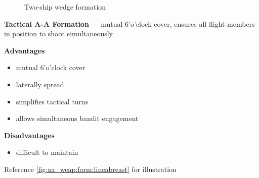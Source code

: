 \begin{figure}[htbp]
\begin{minipage}[b]{0.5\textwidth}
        \caption{Two-ship wedge formation}
        \label{fig:aa_weap:form:wedge}
    \end{minipage}
\end{figure}

\begin{tcoloritemize}
    \textbf{Tactical A-A Formation} --- mutual 6'o'clock cover, ensures all flight members in position to shoot simultaneously
    \medskip

    \textbf{Advantages}
    \begin{itemize}
        \item mutual 6'o'clock cover
        \item laterally spread
        \item simplifies tactical turns
        \item allows simultaneous bandit engagement
    \end{itemize}

    \textbf{Disadvantages}
    \begin{itemize}
        \item difficult to maintain
    \end{itemize}

    Reference \cref{fig:aa_weap:form:lineabreast} for illustration
\end{tcoloritemize}

